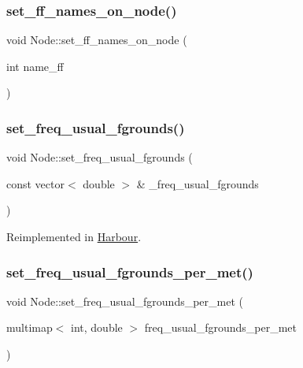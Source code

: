 \mbox{\label{class_node_a4b7891f21f59337e44b3ab9eb2fe2aaa}} 
\subsubsection{\texorpdfstring{set\_ff\_names\_on\_node()}{set\_ff\_names\_on\_node()}}
{\footnotesize\ttfamily void Node\+::set\+\_\+ff\+\_\+names\+\_\+on\+\_\+node (\begin{DoxyParamCaption}\item[{int}]{name\+\_\+ff }\end{DoxyParamCaption})}

\mbox{\label{class_node_a89f4c8cc73721328fb2148136b713fd0}} 
\subsubsection{\texorpdfstring{set\_freq\_usual\_fgrounds()}{set\_freq\_usual\_fgrounds()}}
{\footnotesize\ttfamily void Node\+::set\+\_\+freq\+\_\+usual\+\_\+fgrounds (\begin{DoxyParamCaption}\item[{const vector$<$ double $>$ \&}]{\+\_\+freq\+\_\+usual\+\_\+fgrounds }\end{DoxyParamCaption})\hspace{0.3cm}{\ttfamily [virtual]}}



Reimplemented in \mbox{\hyperlink{class_harbour_ab64450e0c491deb6ac7927c27b9e45d6}{Harbour}}.

\mbox{\label{class_node_af7f54afbacab1aae936436ea2ee029f0}} 
\subsubsection{\texorpdfstring{set\_freq\_usual\_fgrounds\_per\_met()}{set\_freq\_usual\_fgrounds\_per\_met()}}
{\footnotesize\ttfamily void Node\+::set\+\_\+freq\+\_\+usual\+\_\+fgrounds\+\_\+per\+\_\+met (\begin{DoxyParamCaption}\item[{multimap$<$ int, double $>$}]{freq\+\_\+usual\+\_\+fgrounds\+\_\+per\+\_\+met }\end{DoxyParamCaption})\hspace{0.3cm}{\ttfamily [virtual]}}



